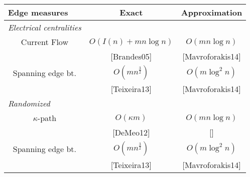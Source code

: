\documentclass[12pt,a4paper]{article}
\begin{document}
 


\begin{table}%
  \centering
    \label{table:cfc_convergence}
  \begin{tabular}{lcc}
  \toprule
 Edge measures & Exact & Approximation  \\
\midrule
\textit{Electrical centralities}\\
\multicolumn{1}{c}{{Current Flow}} & \multicolumn{1}{c}{{$O(I(n) + mn\log n)$}} & \multicolumn{1}{c}{{$O(mn\log n)$}}\\
 & [Brandes05] & [Mavroforakis14] \\
 \multicolumn{1}{c}{{Spanning edge bt.}} & \multicolumn{1}{c}{{$O(mn^{\frac{3}{2}})$}} & \multicolumn{1}{c}{{$O(m\log^2 n)$}}\\
  & [Teixeira13] & [Mavroforakis14] \\
  
 \midrule
 \textit{Randomized}\\
 \multicolumn{1}{c}{{$\kappa$-path}} & \multicolumn{1}{c}{{$O(\kappa m)$}} & \multicolumn{1}{c}{{$O(mn\log n)$}}\\
  & [DeMeo12] & [] \\
  \multicolumn{1}{c}{{Spanning edge bt.}} & \multicolumn{1}{c}{{$O(mn^{\frac{3}{2}})$}} & \multicolumn{1}{c}{{$O(m\log^2 n)$}}\\
   & [Teixeira13] & [Mavroforakis14] \\
\bottomrule
\end{tabular}
\end{table}
\end{document}
